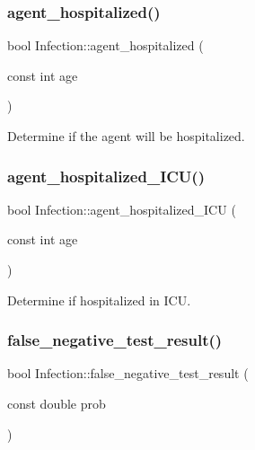 \subsubsection{\texorpdfstring{agent\+\_\+hospitalized()}{agent\_hospitalized()}}
{\footnotesize\ttfamily bool Infection\+::agent\+\_\+hospitalized (\begin{DoxyParamCaption}\item[{const int}]{age }\end{DoxyParamCaption})}



Determine if the agent will be hospitalized. 

\mbox{\label{classInfection_a876b380a5c807d6a904bcf6e293748b6}} 
\subsubsection{\texorpdfstring{agent\+\_\+hospitalized\+\_\+\+I\+C\+U()}{agent\_hospitalized\_ICU()}}
{\footnotesize\ttfamily bool Infection\+::agent\+\_\+hospitalized\+\_\+\+I\+CU (\begin{DoxyParamCaption}\item[{const int}]{age }\end{DoxyParamCaption})}



Determine if hospitalized in I\+CU. 

\mbox{\label{classInfection_adedba0ccbb05007fb07d4a7f08a3c538}} 
\subsubsection{\texorpdfstring{false\+\_\+negative\+\_\+test\+\_\+result()}{false\_negative\_test\_result()}}
{\footnotesize\ttfamily bool Infection\+::false\+\_\+negative\+\_\+test\+\_\+result (\begin{DoxyParamCaption}\item[{const double}]{prob }\end{DoxyParamCaption})}



